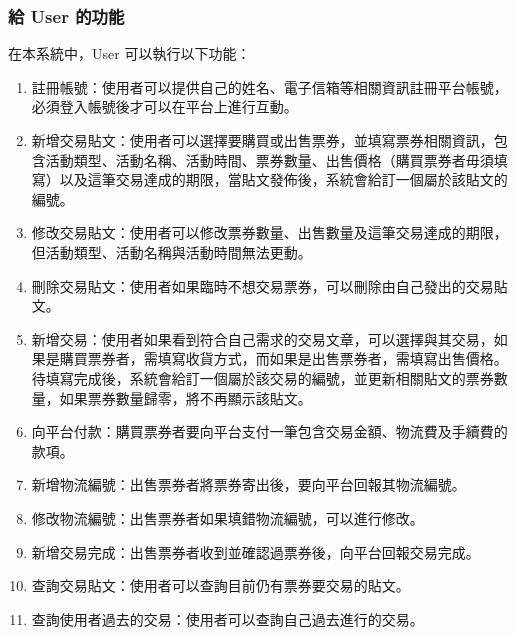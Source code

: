 \documentclass[12pt,a4paper]{article}
\begin{document}
\subsubsection{給 User 的功能}

在本系統中，User 可以執行以下功能：
\begin{enumerate}
\item 

註冊帳號：使用者可以提供自己的姓名、電子信箱等相關資訊註冊平台帳號，必須登入帳號後才可以在平台上進行互動。

\item 

新增交易貼文：使用者可以選擇要購買或出售票券，並填寫票券相關資訊，包含活動類型、活動名稱、活動時間、票券數量、出售價格（購買票券者毋須填寫）以及這筆交易達成的期限，當貼文發佈後，系統會給訂一個屬於該貼文的編號。

\item 

修改交易貼文：使用者可以修改票券數量、出售數量及這筆交易達成的期限，但活動類型、活動名稱與活動時間無法更動。

\item 

刪除交易貼文：使用者如果臨時不想交易票券，可以刪除由自己發出的交易貼文。

\item 

新增交易：使用者如果看到符合自己需求的交易文章，可以選擇與其交易，如果是購買票券者，需填寫收貨方式，而如果是出售票券者，需填寫出售價格。待填寫完成後，系統會給訂一個屬於該交易的編號，並更新相關貼文的票券數量，如果票券數量歸零，將不再顯示該貼文。

\item 

向平台付款：購買票券者要向平台支付一筆包含交易金額、物流費及手續費的款項。

\item 

新增物流編號：出售票券者將票券寄出後，要向平台回報其物流編號。

\item 

修改物流編號：出售票券者如果填錯物流編號，可以進行修改。

\item 

新增交易完成：出售票券者收到並確認過票券後，向平台回報交易完成。

\item 

查詢交易貼文：使用者可以查詢目前仍有票券要交易的貼文。

\item 

查詢使用者過去的交易：使用者可以查詢自己過去進行的交易。
        
\end{enumerate}
   
\end{document}
